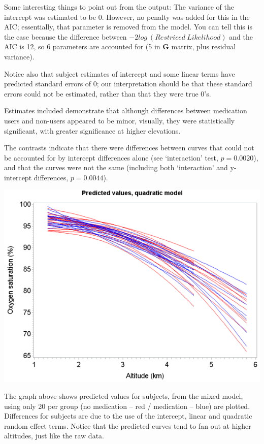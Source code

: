 \documentclass[
  9pt,
  ignorenonframetext,
]{beamer}
\begin{document}
\begin{frame}{Some interesting things to point out from the output:}
\protect\hypertarget{some-interesting-things-to-point-out-from-the-output}{}
The variance of the intercept was estimated to be 0. However, no penalty
was added for this in the AIC; essentially, that parameter is removed
from the model. You can tell this is the case because the difference
between \(-2 log\ (Restriced\ Likelihood)\) and the AIC is 12, so 6
parameters are accounted for (5 in \(\pmb G\) matrix, plus residual
variance).

Notice also that subject estimates of intercept and some linear terms
have predicted standard errors of 0; our interpretation should be that
these standard errors could not be estimated, rather than that they were
true 0's.

Estimates included demonstrate that although differences between
medication users and non-users appeared to be minor, visually, they were
statistically significant, with greater significance at higher
elevations.

The contrasts indicate that there were differences between curves that
could not be accounted for by intercept differences alone (see
`interaction' test, \(p=0.0020\)), and that the curves were not the same
(including both `interaction' and y-intercept differences,
\(p=0.0044\)).
\end{frame}

\begin{frame}{}
\protect\hypertarget{section-12}{}
\begin{center}\includegraphics[width=0.6\linewidth]{figs_L7/f4} \end{center}

The graph above shows predicted values for subjects, from the mixed
model, using only 20 per group (no medication -- red / medication --
blue) are plotted. Differences for subjects are due to the use of the
intercept, linear and quadratic random effect terms. Notice that the
predicted curves tend to fan out at higher altitudes, just like the raw
data.
\end{frame}
\end{document}
